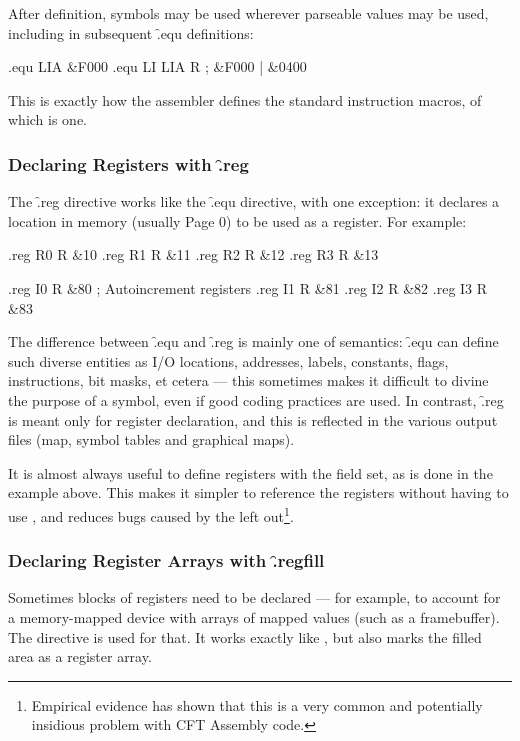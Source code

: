 After definition, symbols may be used wherever parseable values may be used,
including in subsequent \f{.equ definitions}:

\begin{cftasmcode}
.equ LIA   &F000
.equ LI    LIA  R   ; &F000 | &0400
\end{cftasmcode}

This is exactly how the assembler defines the standard instruction macros, of
which  is one.



\subsubsection{Declaring Registers with \f{.reg}}

The \f{.reg} directive works like the \f{.equ} directive, with one exception:
it declares a location in memory (usually Page 0) to be used as a register. For
example:

\begin{cftasmcode}
.reg  R0   R &10
.reg  R1   R &11
.reg  R2   R &12
.reg  R3   R &13

.reg  I0   R &80 ; Autoincrement registers
.reg  I1   R &81
.reg  I2   R &82
.reg  I3   R &83
\end{cftasmcode}

The difference between \f{.equ} and \f{.reg} is mainly one of semantics:
\f{.equ} can define such diverse entities as I/O locations, addresses, labels,
constants, flags, instructions, bit masks, et cetera — this sometimes makes it
difficult to divine the purpose of a symbol, even if good coding practices are
used. In contrast, \f{.reg} is meant only for register declaration, and this is
reflected in the various output files (map, symbol tables and graphical maps).

It is almost always useful to define registers with the  field
set, as is done in the example above. This makes it simpler to
reference the registers without having to use , and reduces
bugs caused by the  left out\footnote{Empirical evidence has
  shown that this is a very common and potentially insidious problem
  with CFT Assembly code.}.


\subsubsection{Declaring Register Arrays with \f{.regfill}}

Sometimes blocks of registers need to be declared — for example, to account for
a memory-mapped device with arrays of mapped values (such as a
framebuffer). The  directive is used for that. It works exactly
like , but also marks the filled area as a register array.



